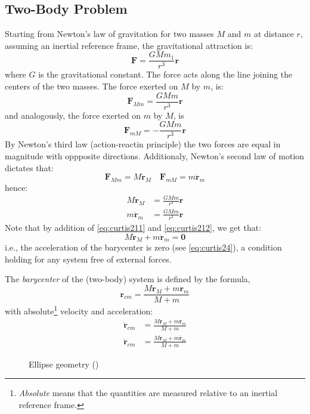 \subsection{Two-Body Problem}
\label{ssec:keplerian-orbits}
Starting from Newton's law of gravitation for two masses $M$ and $m$ at 
distance $r$, assuming an inertial reference frame, the gravitational 
attraction is:
\begin{equation}
  \label{eq:chobotov31}
  \bm{F} = \frac{G M m_1}{r^3} \bm{r}
\end{equation}
where $G$ is the gravitational constant. The force acts along the line joining 
the centers of the two masses. The force exerted on $M$ by $m$, is:
\begin{equation}\label{eq:curtis29}
  \bm{F}_{Mm} = \frac{G M m}{r^3} \bm{r}
\end{equation}
and analogously, the force exerted on $m$ by $M$, is
\begin{equation}\label{eq:curtis210}
  \bm{F}_{mM} = -\frac{G M m}{r^3} \bm{r}
\end{equation}
By Newton's third law (action-reactin principle) the two forces are equal in 
magnitude with oppposite directions. Additionaly, Newton's second law of motion
dictates that:
\begin{equation}\label{eq:curtis2105}
  \bm{F}_{Mm} = M \ddot{\bm{r}}_M \quad \bm{F}_{mM} = m \ddot{\bm{r}}_m
\end{equation}
hence:
\begin{subequations}
  \begin{align}
    M \ddot{\bm{r}}_M &= \frac{G M m}{r^3} \bm{r} \label{eq:curtis211} \\
    m \ddot{\bm{r}}_m &= \frac{G M m}{r^3} \bm{r} \label{eq:curtis212}
  \end{align}
\end{subequations}
Note that by addition of \ref{eq:curtis211} and \ref{eq:curtis212}, we get that:
\begin{equation}
  M \ddot{\bm{r}}_M + m \ddot{\bm{r}}_m = \bm{0}
\end{equation}
i.e., the acceleration of the barycenter is zero (see \ref{eq:curtis24}), a 
condition holding for any system free of external forces.

The \emph{barycenter} of the (two-body) system is defined by the formula,
\begin{equation}\label{eq:curtis22}
  \bm{r}_{cm} = \frac{M \bm{r}_M + m \bm{r}_m }{M + m}
\end{equation}
with absolute\footnote{\emph{Absolute} means that the quantities are measured relative to an inertial reference frame.} 
velocity and acceleration:
\begin{subequations}
  \begin{align}
    \dot{\bm{r}}_{cm} &= \frac{M \dot{\bm{r}}_M + m \dot{\bm{r}}_m }{M + m} \label{eq:curtis23} \\
    \ddot{\bm{r}}_{cm} &= \frac{M \ddot{\bm{r}}_M + m \ddot{\bm{r}}_m }{M + m} \label{eq:curtis24}
  \end{align}
\end{subequations}

\begin{figure}
\centering

\caption{Ellipse geometry (\cite{chobotov})}
\label{fig:ellipse-geometry}
\end{figure}
\fi
